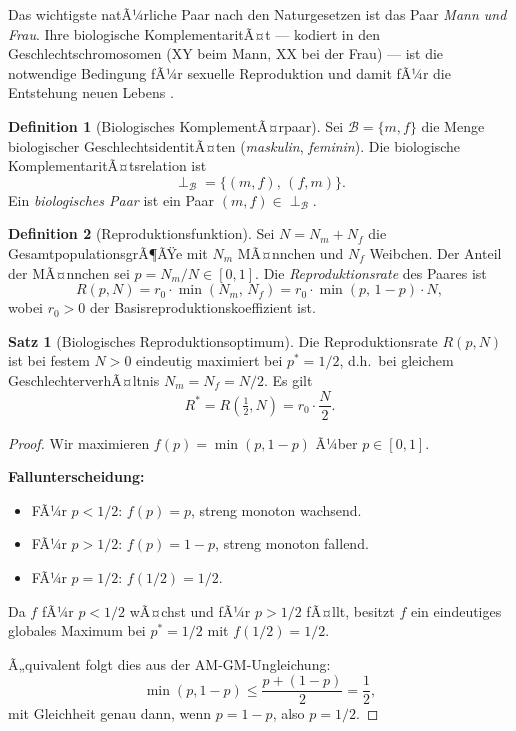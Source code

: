 ﻿\documentclass[a4paper,12pt]{article}
\theoremstyle{definition}
\newtheorem{definition}{Definition}
\newtheorem{satz}{Satz}
\begin{document}
Das wichtigste natÃ¼rliche Paar nach den Naturgesetzen ist das Paar \emph{Mann und Frau}.
Ihre biologische KomplementaritÃ¤t --- kodiert in den Geschlechtschromosomen (XY beim Mann,
XX bei der Frau) --- ist die notwendige Bedingung fÃ¼r sexuelle Reproduktion und damit fÃ¼r
die Entstehung neuen Lebens \cite{alberts2015,mayr1963}.

\begin{definition}[Biologisches KomplementÃ¤rpaar]
	Sei $\mathcal{B} = \{m, f\}$ die Menge biologischer GeschlechtsidentitÃ¤ten
	(\emph{maskulin}, \emph{feminin}).
	Die biologische KomplementaritÃ¤tsrelation ist
	\[
		\perp_{\mathcal{B}} = \{(m, f),\, (f, m)\}.
	\]
	Ein \emph{biologisches Paar} ist ein Paar $(m, f) \in \perp_{\mathcal{B}}$.
\end{definition}

\begin{definition}[Reproduktionsfunktion]
	Sei $N = N_m + N_f$ die GesamtpopulationsgrÃ¶ÃŸe mit $N_m$ MÃ¤nnchen und $N_f$ Weibchen.
	Der Anteil der MÃ¤nnchen sei $p = N_m / N \in [0,1]$.
	Die \emph{Reproduktionsrate} des Paares ist
	\[
		R(p, N) = r_0 \cdot \min(N_m,\, N_f) = r_0 \cdot \min(p,\, 1-p) \cdot N,
	\]
	wobei $r_0 > 0$ der Basisreproduktionskoeffizient ist.
\end{definition}

\begin{satz}[Biologisches Reproduktionsoptimum]
	\label{satz:repro}
	Die Reproduktionsrate $R(p, N)$ ist bei festem $N > 0$ eindeutig maximiert
	bei $p^* = 1/2$, d.h.\ bei gleichem GeschlechterverhÃ¤ltnis $N_m = N_f = N/2$.
	Es gilt
	\[
		R^* = R\!\left(\tfrac{1}{2}, N\right) = r_0 \cdot \frac{N}{2}.
	\]
\end{satz}

\begin{proof}
	Wir maximieren $f(p) = \min(p, 1-p)$ Ã¼ber $p \in [0,1]$.
	
	\textbf{Fallunterscheidung:}
	\begin{itemize}
		\item FÃ¼r $p < 1/2$: $f(p) = p$, streng monoton wachsend.
		\item FÃ¼r $p > 1/2$: $f(p) = 1-p$, streng monoton fallend.
		\item FÃ¼r $p = 1/2$: $f(1/2) = 1/2$.
	\end{itemize}
	
	Da $f$ fÃ¼r $p < 1/2$ wÃ¤chst und fÃ¼r $p > 1/2$ fÃ¤llt, besitzt $f$ ein eindeutiges
	globales Maximum bei $p^* = 1/2$ mit $f(1/2) = 1/2$.
	
	Ã„quivalent folgt dies aus der AM-GM-Ungleichung:
	\[
		\min(p, 1-p) \leq \frac{p + (1-p)}{2} = \frac{1}{2},
	\]
	mit Gleichheit genau dann, wenn $p = 1-p$, also $p = 1/2$. \qedhere
\end{proof}
\end{document}
